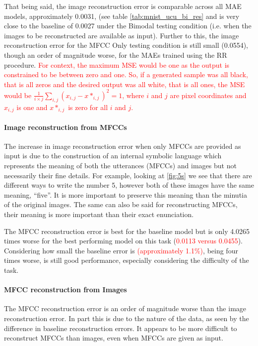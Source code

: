 That being said, the image reconstruction error is comparable across all \ac{MAE} models, approximately 0.0031, (see table \autoref{tab:mnist_ucu_bi_res} and is very close to the baseline of 0.0027 under the Bimodal testing condition (i.e. when the images to be reconstructed are available as input). Further to this, the image reconstruction error for the \ac{MFCC} Only testing condition is still small (0.0554), though an order of magnitude worse, for the \acp{MAE} trained using the RR procedure. \textcolor{red}{For context, the maximum \ac{MSE} would be one as the output is constrained to be between zero and one. So, if a generated sample was all black, that is all zeros and the desired output was all white, that is all ones, the \ac{MSE} would be $\frac{1}{i \times j}\sum_{i,j}({x_{i,j} - x*_{i,j}})^2 = 1$, where $i$ and $j$ are pixel coordinates and $x_{i,j}$ is one  and $x*_{i,j}$ is zero for all $i$ and $j$.}

\paragraph{Image reconstruction from MFCCs}
The increase in image reconstruction error when only \acp{MFCC} are provided as input is due to the construction of an internal symbolic language which represents the meaning of both the utterances (\acp{MFCC}) and images but not necessarily their fine details. For example, looking at \autoref{fig:5s} we see that there are different ways to write the number 5, however both of these images have the same meaning, ``five''. It is more important to preserve this meaning than the minutia of the original images. The same can also be said for reconstructing \acp{MFCC}, their meaning is more important than their exact enunciation.  

The \ac{MFCC} reconstruction error is best for the baseline model but is only 4.0265 times worse for the best performing model on this task (\textcolor{red}{0.0113 versus 0.0455}). Considering how small the baseline error is \textcolor{red}{(approximately 1.1\%)}, being four times worse, is still good performance, especially considering the difficulty of the task. 

\paragraph{MFCC reconstruction from Images}
The \ac{MFCC} reconstruction error is an order of magnitude worse than the image reconstruction error. In part this is due to the nature of the data, as seen by the difference in baseline reconstruction errors. It appears to be more difficult to reconstruct \acp{MFCC} than images, even when \acp{MFCC} are given as input.

